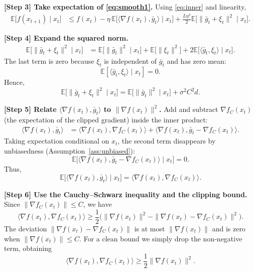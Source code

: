 \documentclass{article}
\newcommand{\EE}{\mathbb{E}}
\newcommand{\norm}[1]{\left\|#1\right\|}
\newcommand{\grad}{\nabla}
\begin{document}
\noindent\textbf{[Step 3] Take expectation of \eqref{eq:smooth1}.}  
Using \eqref{eq:inner} and linearity,
\begin{align}
\EE\!\bigl[f(x_{t+1})\mid x_{t}\bigr] 
&\le f(x_{t})-\eta\,\EE\!\bigl[\langle \grad f(x_{t}),\bar g_{t}\rangle\mid x_{t}\bigr] 
   +\frac{L\eta^{2}}{2}\EE\!\bigl[\|\bar g_{t}+\xi_{t}\|^{2}\mid x_{t}\bigr].\label{eq:exp1}
\end{align}

\noindent\textbf{[Step 4] Expand the squared norm.}
\begin{align}
\EE\!\bigl[\|\bar g_{t}+\xi_{t}\|^{2}\mid x_{t}\bigr]
&= \EE\!\bigl[\|\bar g_{t}\|^{2}\mid x_{t}\bigr] 
   + \EE\!\bigl[\|\xi_{t}\|^{2}\bigr] 
   + 2\EE\!\bigl[\langle\bar g_{t},\xi_{t}\rangle\mid x_{t}\bigr]. \tag{S4.1}
\end{align}
The last term is zero because $\xi_{t}$ is independent of $\bar g_{t}$ and has zero mean:
\[
\EE[\langle\bar g_{t},\xi_{t}\rangle\mid x_{t}]=0.\tag{S4.2}
\]
Hence,
\[
\EE\!\bigl[\|\bar g_{t}+\xi_{t}\|^{2}\mid x_{t}\bigr]
= \EE\!\bigl[\|\bar g_{t}\|^{2}\mid x_{t}\bigr] + \sigma^{2}C^{2}d. \tag{S4.3}
\]

\noindent\textbf{[Step 5] Relate $\langle\grad f(x_{t}),\bar g_{t}\rangle$ to $\|\grad f(x_{t})\|^{2}$.}  
Add and subtract $\grad f_{C}(x_{t})$ (the expectation of the clipped gradient) inside the inner product:
\begin{align}
\langle \grad f(x_{t}),\bar g_{t}\rangle
&= \langle \grad f(x_{t}),\grad f_{C}(x_{t})\rangle 
   + \langle \grad f(x_{t}),\bar g_{t}-\grad f_{C}(x_{t})\rangle . \tag{S5.1}
\end{align}
Taking expectation conditional on $x_{t}$, the second term disappears by unbiasedness (Assumption~\ref{ass:unbiased}):
\[
\EE\!\bigl[\langle \grad f(x_{t}),\bar g_{t}-\grad f_{C}(x_{t})\rangle\mid x_{t}\bigr]=0. \tag{S5.2}
\]
Thus,
\[
\EE\!\bigl[\langle \grad f(x_{t}),\bar g_{t}\rangle\mid x_{t}\bigr]
= \langle \grad f(x_{t}),\grad f_{C}(x_{t})\rangle . \tag{S5.3}
\]

\noindent\textbf{[Step 6] Use the Cauchy–Schwarz inequality and the clipping bound.}  
Since $\norm{\grad f_{C}(x_{t})}\le C$, we have
\[
\langle \grad f(x_{t}),\grad f_{C}(x_{t})\rangle 
\ge \frac{1}{2}\bigl(\|\grad f(x_{t})\|^{2} - \|\grad f(x_{t})-\grad f_{C}(x_{t})\|^{2}\bigr). \tag{S6.1}
\]
The deviation $\|\grad f(x_{t})-\grad f_{C}(x_{t})\|$ is at most $\|\grad f(x_{t})\|$ and is zero when $\|\grad f(x_{t})\|\le C$. For a clean bound we simply drop the non‑negative term, obtaining
\[
\langle \grad f(x_{t}),\grad f_{C}(x_{t})\rangle \ge \frac{1}{2}\|\grad f(x_{t})\|^{2}. \tag{S6.2}
\]
\end{document}
